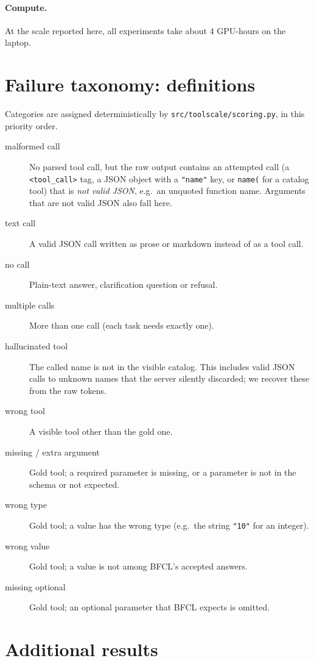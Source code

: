 \paragraph{Compute.}
At the scale reported here, all experiments take about 4 GPU-hours on the laptop.

\section{Failure taxonomy: definitions}
\label{app:taxonomy}

Categories are assigned deterministically by \texttt{src/toolscale/scoring.py}, in this priority order.
\begin{description}
  \item[malformed call] No parsed tool call, but the raw output contains an attempted call (a \texttt{<tool\_call>} tag, a JSON object with a \texttt{"name"} key, or \texttt{name(} for a catalog tool) that is \emph{not valid JSON}, e.g.\ an unquoted function name. Arguments that are not valid JSON also fall here.
  \item[text call] A valid JSON call written as prose or markdown instead of as a tool call.
  \item[no call] Plain-text answer, clarification question or refusal.
  \item[multiple calls] More than one call (each task needs exactly one).
  \item[hallucinated tool] The called name is not in the visible catalog. This includes valid JSON calls to unknown names that the server silently discarded; we recover these from the raw tokens.
  \item[wrong tool] A visible tool other than the gold one.
  \item[missing / extra argument] Gold tool; a required parameter is missing, or a parameter is not in the schema or not expected.
  \item[wrong type] Gold tool; a value has the wrong type (e.g.\ the string \texttt{"10"} for an integer).
  \item[wrong value] Gold tool; a value is not among BFCL's accepted answers.
  \item[missing optional] Gold tool; an optional parameter that BFCL expects is omitted.
\end{description}

\section{Additional results}
\label{app:extra}

